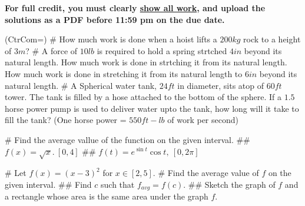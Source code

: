 \documentclass[11pt]{book}
\begin{document}
\thispagestyle{fancy}
\noindent	\textbf{For full credit, you must clearly \underline{show all work}, and upload the solutions as a PDF before 11:59 pm on the due date.}\hfill
\vspace{0.3in}
\begin{easylist}
\ListProperties(CtrCom=\fbox)
# How much work is done when a hoist lifts a \(200kg\) rock to a height of \(3m\)?
\vspace{0.5in}
# A force of \(10lb\) is required to hold a spring strtched \(4in\) beyond its natural length. How much work is done in strtching it from its natural length. How much work is done in stretching it from its natural length to \(6in\) beyond its natural length. 
\vspace{0.5in}
# A Spherical water tank, $24ft$ in diameter, sits atop of \(60ft\) tower. The tank is filled by a hose attached to the bottom of the sphere. If a \(1.5\) horse power pump is used to deliver water upto the tank, how long will it take to fill the tank? (One horse power = \(550ft-lb\) of work per second)

\vspace{0.5in}

# Find the average vallue of the function on the given interval.
\vspace{0.2in}
## \(f(x)=\sqrt{x}.~[0,4]\)
\vspace{0.2in}
## \(f(t)=e^{\sin t} \cos t,~[0,2\pi] \)
\vspace{0.5in}

# Let \(f(x)=(x-3)^2\) for \(x \in [2,5]\).
\vspace{0.2in}
# Find the average value of \(f\) on the given interval. 
\vspace{0.2in}
## Find \(c\) such that \(f_{avg}=f(c)\).
\vspace{0.2in}
## Sketch the graph of \(f\) and a rectangle whose area is the same area under the graph \(f\). 
 \end{easylist}
\end{document}
